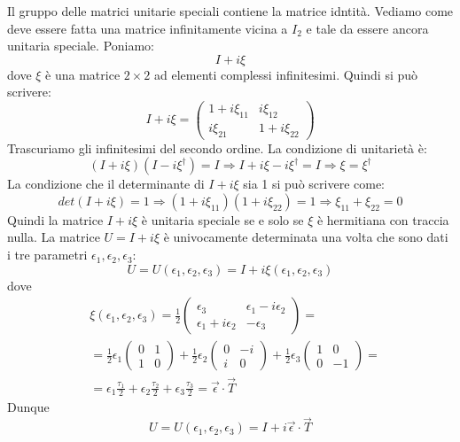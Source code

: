  Il gruppo delle matrici unitarie speciali contiene la
matrice idntità. Vediamo come deve essere fatta una matrice infinitamente vicina
a $I_2$ e tale da essere ancora unitaria speciale. Poniamo:
\[
I+i\xi
\]
dove $\xi$ è una matrice $2\times 2$ ad elementi complessi infinitesimi. Quindi
si può scrivere:
\[
I+i\xi=
\begin{pmatrix}
1+i\xi_{11} & i\xi_{12}\\
i\xi_{21} & 1+i\xi_{22}
\end{pmatrix}
\]
Trascuriamo gli infinitesimi del secondo ordine. La condizione di unitarietà è:
\begin{equation}
(I+i\xi)(I-i\xi^{\dagger})=I\Rightarrow I+i\xi-i\xi^{\dagger}=I\Rightarrow \xi=\xi^{\dagger}
\end{equation}
La condizione che il determinante di $I+i\xi$ sia 1 si può scrivere come:
\begin{equation}
det(I+i\xi)=1\Rightarrow (1+i\xi_{11})(1+i\xi_{22})=1\Rightarrow \xi_{11}+\xi_{22}=0
\end{equation}
Quindi la matrice $I+i\xi$ è unitaria speciale se e solo se $\xi$ è hermitiana
con traccia nulla. La matrice $U=I+i\xi$ è univocamente determinata una volta
che sono dati i tre parametri $\epsilon_1,\epsilon_2,\epsilon_3$:
\[
U=U(\epsilon_1,\epsilon_2,\epsilon_3)=I+i\xi(\epsilon_1,\epsilon_2,\epsilon_3)
\]
dove
\[
\begin{split}
&\xi(\epsilon_1,\epsilon_2,\epsilon_3)=\frac{1}{2}
\begin{pmatrix}
\epsilon_3 & \epsilon_1-i\epsilon_2\\
\epsilon_1+i\epsilon_2 & -\epsilon_3
\end{pmatrix}
=\\
&=\frac{1}{2}\epsilon_1
\begin{pmatrix}
0 & 1\\
1 & 0
\end{pmatrix}
+\frac{1}{2}\epsilon_2
\begin{pmatrix}
0 & -i\\
i & 0
\end{pmatrix}
+\frac{1}{2}\epsilon_3
\begin{pmatrix}
1 & 0\\
0 & -1
\end{pmatrix}
=\\
&=\epsilon_1\frac{\tau_1}{2}+\epsilon_2\frac{\tau_2}{2}+\epsilon_3\frac{\tau_3}{2}=\vec{\epsilon}\cdot\vec{T}
\end{split}
\]
Dunque
\begin{equation}
U=U(\epsilon_1,\epsilon_2,\epsilon_3)=I+i\vec{\epsilon}\cdot\vec{T}
\end{equation}
